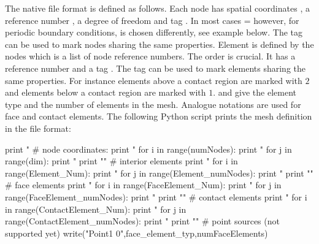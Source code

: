 The native \finley file format is defined as follows.
Each node  has  spatial coordinates , a reference number
, a degree of freedom  and tag .
In most cases = however, for periodic boundary conditions,
 is chosen differently, see example below. The tag can be used to mark nodes sharing
the same properties. Element  is defined by the  nodes 
which is a list of node reference numbers. The order is crucial.
It has a reference number  and a tag . The tag 
can be used to mark elements  sharing the same properties. For instance elements above 
a contact region are marked with $2$ and elements below a contact region are marked with $1$. 
 and  give the element type and the number of elements in the mesh.
Analogue notations are used for face and contact elements. The following Python script
prints the mesh definition in the \finley file format:
\begin{python}
print "%
# node coordinates:
print "%
for i in range(numNodes): 
   print "%
   for j in range(dim): print " %
   print "\n"
# interior elements
print "%
for i in range(Element_Num):
   print "%
   for j in range(Element_numNodes): print " %
   print "\n"
# face elements
print "%
for i in range(FaceElement_Num):
   print "%
   for j in range(FaceElement_numNodes): print " %
   print "\n"
# contact elements
print "%
for i in range(ContactElement_Num):
   print "%
   for j in range(ContactElement_numNodes): print " %
   print "\n"
# point sources (not supported yet)
write("Point1 0",face_element_typ,numFaceElements)
\end{python}

